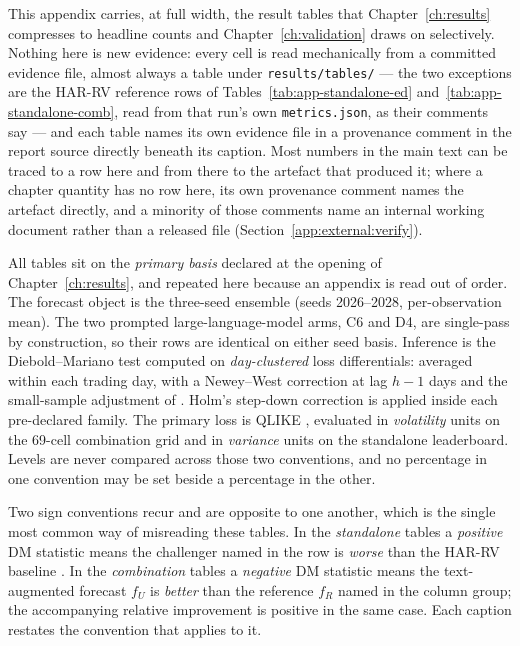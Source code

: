 This appendix carries, at full width, the result tables that
Chapter~\ref{ch:results} compresses to headline counts and
Chapter~\ref{ch:validation} draws on selectively. Nothing here is new
evidence: every cell is read mechanically from a committed evidence file,
almost always a table under \texttt{results/tables/} --- the two exceptions are
the HAR-RV reference rows of Tables~\ref{tab:app-standalone-ed}
and~\ref{tab:app-standalone-comb}, read from that run's own
\texttt{metrics.json}, as their comments say --- and each table names its own
evidence file in a provenance comment in the report source directly
beneath its caption. Most numbers in the main text can be traced to a row
here and from there to the artefact that produced it; where a chapter
quantity has no row here, its own provenance comment names the artefact
directly, and a minority of those comments name an internal working
document rather than a released file (Section~\ref{app:external:verify}).

All tables sit on the \emph{primary basis} declared at the opening of
Chapter~\ref{ch:results}, and repeated here because an appendix is read
out of order. The forecast object is the three-seed ensemble (seeds
2026--2028, per-observation mean). The two prompted large-language-model
arms, C6 and D4, are single-pass by construction, so their rows are
identical on either seed basis. Inference is the Diebold--Mariano test
\cite{diebold1995comparing} computed on \emph{day-clustered} loss
differentials: averaged within each trading day, with a
Newey--West correction at lag $h-1$ days and the small-sample adjustment
of \cite{harvey1997testing}. Holm's step-down correction
\cite{holm1979simple} is applied inside each pre-declared family. The
primary loss is QLIKE \cite{patton2011proxies}, evaluated in
\emph{volatility} units on the 69-cell combination grid and in
\emph{variance} units on the standalone leaderboard. Levels are never
compared across those two conventions, and no percentage in one
convention may be set beside a percentage in the other.

Two sign conventions recur and are opposite to one another, which is the
single most common way of misreading these tables. In the
\emph{standalone} tables a \emph{positive} DM statistic means the
challenger named in the row is \emph{worse} than the HAR-RV baseline
\cite{corsi2009har}. In the \emph{combination} tables a \emph{negative}
DM statistic means the text-augmented forecast $f_U$ is \emph{better}
than the reference $f_R$ named in the column group; the accompanying
relative improvement is positive in the same case. Each caption restates
the convention that applies to it.


